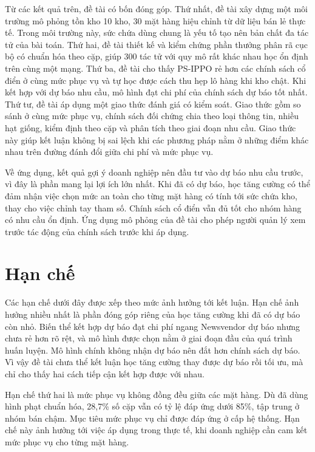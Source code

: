 Từ các kết quả trên, đề tài có bốn đóng góp. Thứ nhất, đề tài xây dựng một môi trường mô phỏng tồn kho 10 kho, 30 mặt hàng hiệu chỉnh từ dữ liệu bán lẻ thực tế. Trong môi trường này, sức chứa dùng chung là yếu tố tạo nên bản chất đa tác tử của bài toán. Thứ hai, đề tài thiết kế và kiểm chứng phần thưởng phân rã cục bộ có chuẩn hóa theo cặp, giúp 300 tác tử với quy mô rất khác nhau học ổn định trên cùng một mạng. Thứ ba, đề tài cho thấy PS-IPPO rẻ hơn các chính sách cổ điển ở cùng mức phục vụ và tự học được cách thu hẹp lô hàng khi kho chật. Khi kết hợp với dự báo nhu cầu, mô hình đạt chi phí của chính sách dự báo tốt nhất. Thứ tư, đề tài áp dụng một giao thức đánh giá có kiểm soát. Giao thức gồm so sánh ở cùng mức phục vụ, chính sách đối chứng chia theo loại thông tin, nhiều hạt giống, kiểm định theo cặp và phân tích theo giai đoạn nhu cầu. Giao thức này giúp kết luận không bị sai lệch khi các phương pháp nằm ở những điểm khác nhau trên đường đánh đổi giữa chi phí và mức phục vụ.

Về ứng dụng, kết quả gợi ý doanh nghiệp nên đầu tư vào dự báo nhu cầu trước, vì đây là phần mang lại lợi ích lớn nhất. Khi đã có dự báo, học tăng cường có thể đảm nhận việc chọn mức an toàn cho từng mặt hàng có tính tới sức chứa kho, thay cho việc chỉnh tay tham số. Chính sách cổ điển vẫn đủ tốt cho nhóm hàng có nhu cầu ổn định. Ứng dụng mô phỏng của đề tài cho phép người quản lý xem trước tác động của chính sách trước khi áp dụng.

\section{Hạn chế}
\label{sec:hanChe}

Các hạn chế dưới đây được xếp theo mức ảnh hưởng tới kết luận. Hạn chế ảnh hưởng nhiều nhất là phần đóng góp riêng của học tăng cường khi đã có dự báo còn nhỏ. Biến thể kết hợp dự báo đạt chi phí ngang Newsvendor dự báo nhưng chưa rẻ hơn rõ rệt, và mô hình được chọn nằm ở giai đoạn đầu của quá trình huấn luyện. Mô hình chính không nhận dự báo nên đắt hơn chính sách dự báo. Vì vậy đề tài chưa thể kết luận học tăng cường thay được dự báo rồi tối ưu, mà chỉ cho thấy hai cách tiếp cận kết hợp được với nhau.

Hạn chế thứ hai là mức phục vụ không đồng đều giữa các mặt hàng. Dù đã dùng hình phạt chuẩn hóa, 28,7\% số cặp vẫn có tỷ lệ đáp ứng dưới 85\%, tập trung ở nhóm bán chậm. Mục tiêu mức phục vụ chỉ được đáp ứng ở cấp hệ thống. Hạn chế này ảnh hưởng tới việc áp dụng trong thực tế, khi doanh nghiệp cần cam kết mức phục vụ cho từng mặt hàng.

